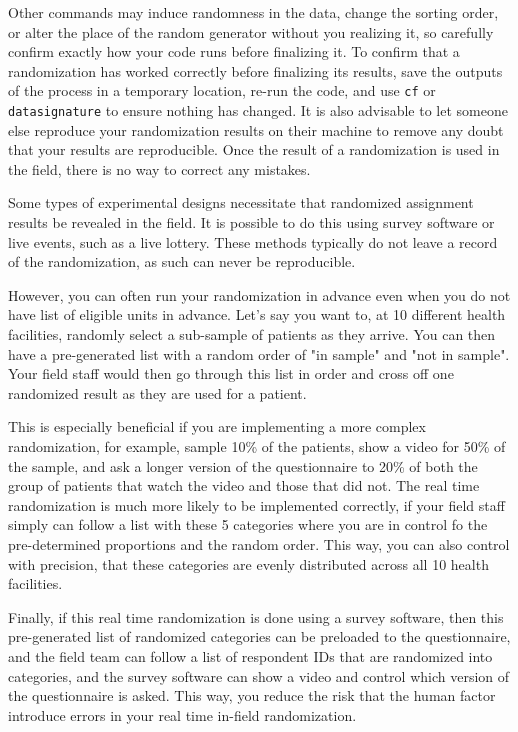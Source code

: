 Other commands may induce randomness in the data,
change the sorting order,
or alter the place of the random generator without you realizing it,
so carefully confirm exactly how your code runs before finalizing it.
To confirm that a randomization has worked correctly before finalizing its results,
save the outputs of the process in a temporary location,
re-run the code, and use \texttt{cf} or \texttt{datasignature} to ensure
nothing has changed. It is also advisable to let someone else reproduce your
randomization results on their machine to remove any doubt that your results
are reproducible.
Once the result of a randomization is used in the field,
there is no way to correct any mistakes.


Some types of experimental designs necessitate
that randomized assignment results be revealed in the field.
It is possible to do this using survey software or live events, such as a live lottery.
These methods typically do not leave a record of the randomization,
as such can never be reproducible. 

However, you can often run your randomization in advance 
even when you do not have list of eligible units in advance.
Let's say you want to, at 10 different health facilities, 
randomly select a sub-sample of patients as they arrive.
You can then have a pre-generated list with a random order of "in sample" and "not in sample".
Your field staff would then go through this list in order
and cross off one randomized result as they are used for a patient.

This is especially beneficial if you are implementing a more complex randomization,
for example, sample 10\% of the patients, show a video for 50\% of the sample, 
and ask a longer version of the questionnaire to 20\% of both 
the group of patients that watch the video and those that did not.
The real time randomization is much more likely to be implemented correctly,
if your field staff simply can follow a list with these 5 categories
where you are in control fo the pre-determined proportions and the random order.
This way, you can also control with precision,
that these categories are evenly distributed across all 10 health facilities.

Finally, if this real time randomization is done using a survey software,
then this pre-generated list of randomized categories can be preloaded
to the questionnaire, 
and the field team can follow a list of respondent IDs that are randomized into categories,
and the survey software can show a video and control which version of the questionnaire is asked.
This way, you reduce the risk that the human factor introduce errors 
in your real time in-field randomization.


